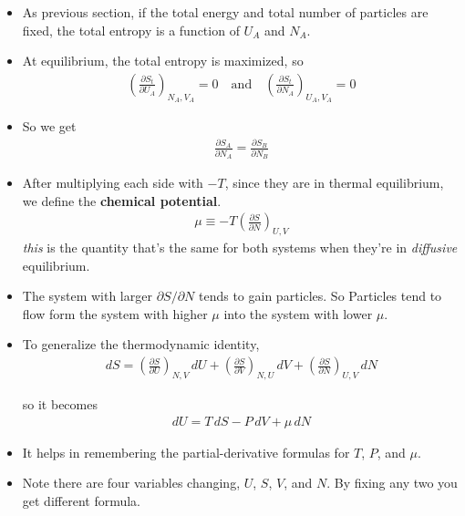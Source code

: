 \documentclass{book}
\begin{document}
\begin{itemize}
	\item As previous section, if the total energy and total number of particles are fixed, the total entropy is a
	      function of $ U_{A} $ and $ N_{A} $.
	\item At equilibrium, the total entropy is maximized, so
	      \begin{align}
		      \left( \frac{\partial S_{t}}{\partial U_{A}} \right)_{N_A, V_A} = 0
		      \quad \text{and} \quad
		      \left( \frac{\partial S_{t}}{\partial N_{A}} \right)_{U_A, V_A} = 0
	      \end{align}
	\item So we get
	      \begin{align}
		      \frac{\partial S_{A}}{\partial N_{A}} = \frac{\partial S_{B}}{\partial N_{B}}
	      \end{align}
	\item After multiplying each side with $-T$, since they are in thermal equilibrium, we define the
	      \textbf{chemical potential}.
	      \begin{align}
		      \label{eq:chemical potential}
		      \mu \equiv -T \left( \frac{\partial S}{\partial N} \right)_{U,V}
	      \end{align}
	      \textit{this} is the quantity that's the same for both systems when they're in \textit{diffusive} equilibrium.
	\item The system with larger $ \partial S/ \partial N$ tends to gain particles. So Particles tend to flow
	      form the system with higher $ \mu $ into the system with lower $ \mu $.
	\item To generalize the thermodynamic identity,
	      \begin{align}
		      dS = \left( \frac{\partial S}{\partial U} \right)_{N,V} \, dU
		      + \left( \frac{\partial S}{\partial V} \right)_{N,U}\, dV
		      + \left( \frac{\partial S}{\partial N} \right)_{U, V} \, dN
	      \end{align}

	      so it becomes
	      \begin{align}
		      \label{eq:thermo identity with N}
		      dU = T\, dS - P\, dV + \mu \, dN
	      \end{align}
	\item It helps in remembering the partial-derivative formulas for $ T $, $ P $, and $ \mu $.
	\item Note there are four variables changing, $ U $, $ S $, $ V $, and $ N $. By fixing any two you get different
	      formula.
\end{itemize}
\end{document}
